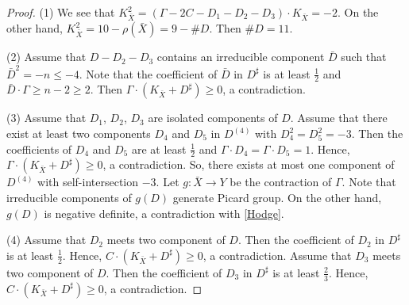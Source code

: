 \documentclass[10pt,oneside,reqno]{amsart}
\newcommand{\pp}{\mathbb{P}}
\theoremstyle{definition}
\theoremstyle{remark}
\numberwithin{equation}{section}
\begin{document}
\begin{proof}
(1) We see that $K_{\bar{X}}^2=(\Gamma-2C-D_1-D_2-D_3)\cdot K_{\bar{X}}=-2$. On the other hand, $K_{\bar{X}}^2=10-\rho(\bar{X})=9-\#D$. Then $\#D=11$.

(2) Assume that $D-D_2-D_3$ contains an irreducible component $\bar{D}$ such that $\bar{D}^2=-n\leq -4$. Note that the coefficient of $\bar{D}$ in $D^{\sharp}$ is at least $\frac{1}{2}$ and $\bar{D}\cdot\Gamma\geq n-2\geq 2$. Then $\Gamma\cdot(K_{\bar{X}}+D^{\sharp})\geq 0$, a contradiction.

(3) Assume that $D_1$, $D_2$, $D_3$ are isolated components of $D$. Assume that there exist at least two components $D_4$ and $D_5$ in $D^{(4)}$ with $D_4^2=D_5^2=-3$. Then the coefficients of $D_4$ and $D_5$ are at least $\frac{1}{2}$ and $\Gamma\cdot D_4=\Gamma\cdot D_5=1$. Hence, $\Gamma\cdot(K_{\bar{X}}+D^{\sharp})\geq 0$, a contradiction. So, there exists at most one component of $D^{(4)}$ with self-intersection $-3$. Let $g\colon\bar{X}\rightarrow Y$ be the contraction of $\Gamma$. Note that irreducible components of $g(D)$ generate Picard group. On the other hand, $g(D)$ is negative definite, a contradiction with \ref{Hodge}.

(4) Assume that $D_2$ meets two component of $D$. Then the coefficient of $D_2$ in $D^{\sharp}$ is at least $\frac{1}{2}$. Hence, $C\cdot(K_{\bar{X}}+D^{\sharp})\geq 0$, a contradiction. Assume that $D_3$ meets two component of $D$. Then the coefficient of $D_3$ in $D^{\sharp}$ is at least $\frac{2}{3}$. Hence, $C\cdot(K_{\bar{X}}+D^{\sharp})\geq 0$, a contradiction.




\end{proof}
\end{document}
